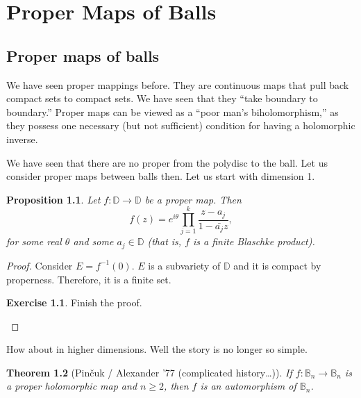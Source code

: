 \documentclass[12pt,openany]{book}
\newcommand{\bB}{{\mathbb{B}}}
\newcommand{\bD}{{\mathbb{D}}}
\theoremstyle{plain}
\newtheorem{thm}{Theorem}[section]
\newtheorem{prop}[thm]{Proposition}
\theoremstyle{remark}
\theoremstyle{definition}
\theoremstyle{exercise}
\newtheorem{exercise}{Exercise}[section]
\theoremstyle{example}
\begin{document}

\chapter{Proper Maps of Balls} \label{proper:chapter}


\section{Proper maps of balls}

We have seen proper mappings before. They are continuous maps that pull back
compact sets to compact sets.  We have seen that they ``take boundary to
boundary.''  Proper maps can be viewed as a ``poor man's biholomorphism,'' as
they possess one necessary (but not sufficient) condition for having a
holomorphic inverse.

We have seen that there are no proper from the polydisc to the ball.
Let us consider proper maps between balls then.  Let us start with dimension
1.

\begin{prop}
Let $f \colon \bD \to \bD$ be a proper map.  Then
\begin{equation}
f(z) = 
e^{i\theta} \prod_{j=1}^k \frac{z-a_j}{1-\bar{a_j} z} ,
\end{equation}
for some real $\theta$ and some $a_j \in \bD$ (that is, $f$ is a finite
Blaschke product).
\end{prop}

\begin{proof}
Consider $E=f^{-1}(0)$.  $E$ is a subvariety of $\bD$ and it is compact by
properness.  Therefore, it is a finite set.

\begin{exercise}
Finish the proof.
\end{exercise}
\end{proof}

How about in higher dimensions.  Well the story is no longer so simple.

\begin{thm}[Pin{\v c}uk / Alexander '77 (complicated history\ldots)]
If $f \colon \bB_n \to \bB_n$ is a proper holomorphic map and $n \geq 2$, then $f$
is an automorphism of $\bB_n$.
\end{thm}
\end{document}
